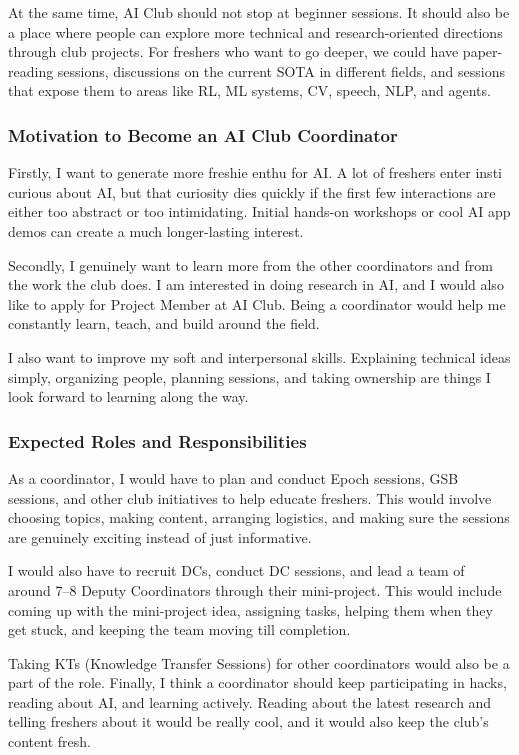 \documentclass[11pt,a4paper]{article}
\begin{document}
At the same time, AI Club should not stop at beginner sessions. It should also be a place where people can explore more technical and research-oriented directions through club projects. For freshers who want to go deeper, we could have paper-reading sessions, discussions on the current SOTA in different fields, and sessions that expose them to areas like RL, ML systems, CV, speech, NLP, and agents.

\subsubsection{Motivation to Become an AI Club Coordinator}
Firstly, I want to generate more freshie enthu for AI. A lot of freshers enter insti curious about AI, but that curiosity dies quickly if the first few interactions are either too abstract or too intimidating. Initial hands-on workshops or cool AI app demos can create a much longer-lasting interest.

Secondly, I genuinely want to learn more from the other coordinators and from the work the club does. I am interested in doing research in AI, and I would also like to apply for Project Member at AI Club. Being a coordinator would help me constantly learn, teach, and build around the field.

I also want to improve my soft and interpersonal skills. Explaining technical ideas simply, organizing people, planning sessions, and taking ownership are things I look forward to learning along the way.

\subsubsection{Expected Roles and Responsibilities}
As a coordinator, I would have to plan and conduct Epoch sessions, GSB sessions, and other club initiatives to help educate freshers. This would involve choosing topics, making content, arranging logistics, and making sure the sessions are genuinely exciting instead of just informative.

I would also have to recruit DCs, conduct DC sessions, and lead a team of around 7--8 Deputy Coordinators through their mini-project. This would include coming up with the mini-project idea, assigning tasks, helping them when they get stuck, and keeping the team moving till completion.

Taking KTs (Knowledge Transfer Sessions) for other coordinators would also be a part of the role. Finally, I think a coordinator should keep participating in hacks, reading about AI, and learning actively. Reading about the latest research and telling freshers about it would be really cool, and it would also keep the club's content fresh.
\end{document}
